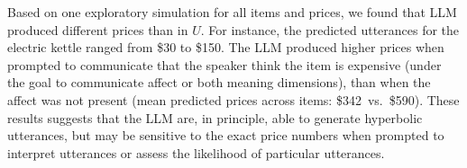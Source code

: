 Based on one exploratory simulation for all items and prices, we found that LLM produced different prices than in $U$. For instance, the predicted utterances for the electric kettle ranged from \$30 to \$150. The LLM produced higher prices when prompted to communicate that the speaker think the item is expensive (under the goal to communicate affect or both meaning dimensions), than when the affect was not present (mean predicted prices across items: \$342~vs.~\$590). These results suggests that the LLM are, in principle, able to generate hyperbolic utterances, but may be sensitive to the exact price numbers when prompted to interpret utterances or assess the likelihood of particular utterances.
